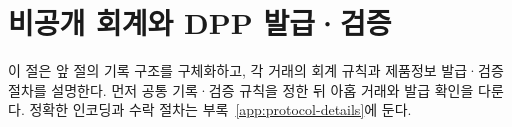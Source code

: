 \section{비공개 회계와 DPP 발급·검증}
\label{sec:accounting}

이 절은 앞 절의 기록 구조를 구체화하고,
각 거래의 회계 규칙과 제품정보 발급·검증 절차를 설명한다.
먼저 공통 기록·검증 규칙을 정한 뒤 아홉 거래와 발급 확인을 다룬다.
정확한 인코딩과 수락 절차는 부록~\ref{app:protocol-details}에 둔다.




